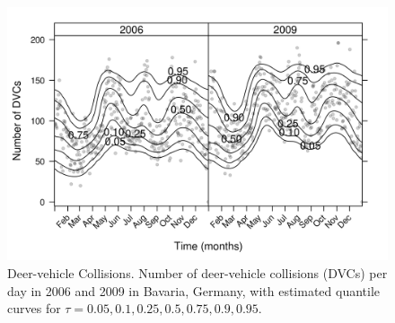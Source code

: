 




\begin{figure}[t]
\includegraphics{figures/fig-DVC-plot}
\caption{Deer-vehicle Collisions. Number of deer-vehicle collisions (DVCs) per day in
         2006 and 2009 in Bavaria, Germany, with estimated quantile curves for 
         $\tau = 0.05, 0.1, 0.25, 0.5, 0.75, 0.9, 0.95$. \label{DVC-plot}}
\end{figure}
